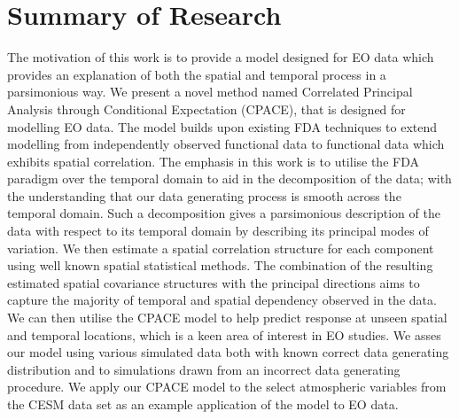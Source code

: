 \section{\label{sec:summary_research}Summary of Research}
The motivation of this work is to provide a model designed for EO data which provides an explanation of both the spatial and temporal process in a parsimonious way.
We present a novel method named Correlated Principal Analysis through Conditional Expectation (CPACE), that is designed for modelling EO data.
The model builds upon existing FDA techniques to extend modelling from independently observed functional data to functional data which exhibits spatial correlation.
The emphasis in this work is to utilise the FDA paradigm over the temporal domain to aid in the decomposition of the data; with the understanding that our data generating process is smooth across the temporal domain.
Such a decomposition gives a parsimonious description of the data with respect to its temporal domain by describing its principal modes of variation.
We then estimate a spatial correlation structure for each component using well known spatial statistical methods.
The combination of the resulting estimated spatial covariance structures with the principal directions aims to capture the majority of temporal and spatial dependency observed in the data.
We can then utilise the CPACE model to help predict response at unseen spatial and temporal locations, which is a keen area of interest in EO studies.
We asses our model using various simulated data both with known correct data generating distribution and to simulations drawn from an incorrect data generating procedure.
We apply our CPACE model to the select atmospheric variables from the CESM data set as an example application of the model to EO data.

